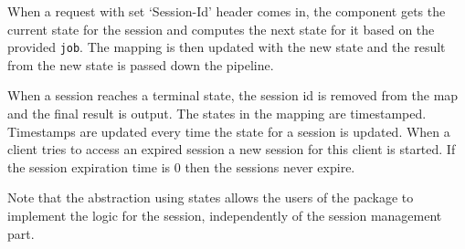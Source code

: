 When a request with set `Session-Id' header comes in, the component gets the current 
state for the session and computes the next state for it based on the provided 
\texttt{job}.
The mapping is then updated with the new state and the result from the new state
is passed down the pipeline.

When a session reaches a terminal state, the session id is removed from the map
and the final result is output.
The states in the mapping are timestamped. Timestamps are updated every time
the state for a session is updated. When a client tries to access an expired
session a new session for this client is started. If the session expiration
time is 0 then the sessions never expire.

Note that the abstraction using states allows the users of the 
package to implement the logic for the session, independently of 
the session management part.

